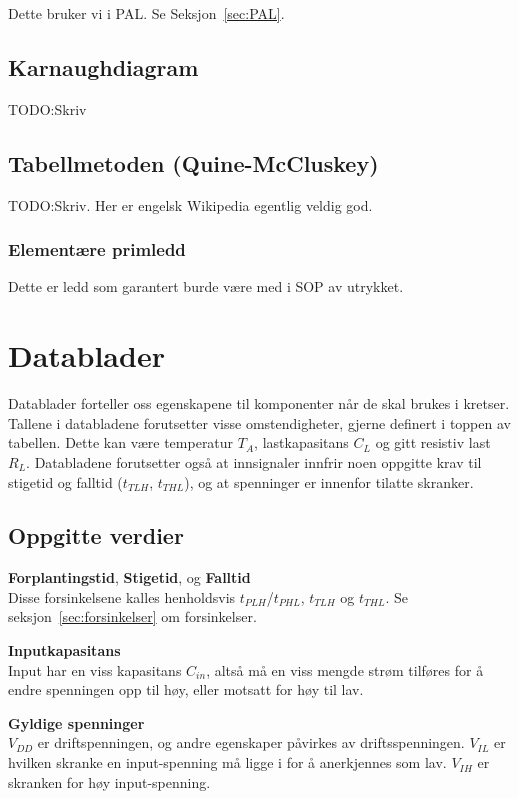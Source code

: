 \documentclass[12pt,a4paper,norsk]{article}
\begin{document}
Dette bruker vi i PAL. Se Seksjon~\ref{sec:PAL}.

\subsection{Karnaughdiagram}
TODO\@:Skriv

\subsection{Tabellmetoden (Quine-McCluskey)}
TODO\@:Skriv. Her er engelsk Wikipedia egentlig veldig god.

\subsubsection{Elementære primledd}
Dette er ledd som garantert burde være med i SOP av utrykket.

\section{Datablader}\label{sec:datablader}
Datablader forteller oss egenskapene til komponenter når de skal brukes i kretser.
Tallene i databladene forutsetter visse omstendigheter, gjerne definert i toppen
av tabellen. Dette kan være temperatur $T_{A}$, lastkapasitans $C_{L}$ og gitt
resistiv last $R_{L}$. Databladene forutsetter også at innsignaler innfrir noen
oppgitte krav til stigetid og falltid ($t_{TLH}$, $t_{THL}$), og at spenninger
er innenfor tilatte skranker.

\subsection{Oppgitte verdier}
\textbf{Forplantingstid}, \textbf{Stigetid}, og \textbf{Falltid}\\
Disse forsinkelsene kalles henholdsvis $t_{PLH}$/$t_{PHL}$, $t_{TLH}$ og
$t_{THL}$. Se seksjon~\ref{sec:forsinkelser} om forsinkelser.

\textbf{Inputkapasitans}\\
Input har en viss kapasitans $C_{in}$, altså må en viss mengde strøm tilføres for å endre
spenningen opp til høy, eller motsatt for høy til lav.

\textbf{Gyldige spenninger}\\
$V_{DD}$ er driftspenningen, og andre egenskaper påvirkes av driftsspenningen.
$V_{IL}$ er hvilken skranke en input-spenning må ligge i for å anerkjennes som
lav. $V_{IH}$ er skranken for høy input-spenning.
\end{document}
